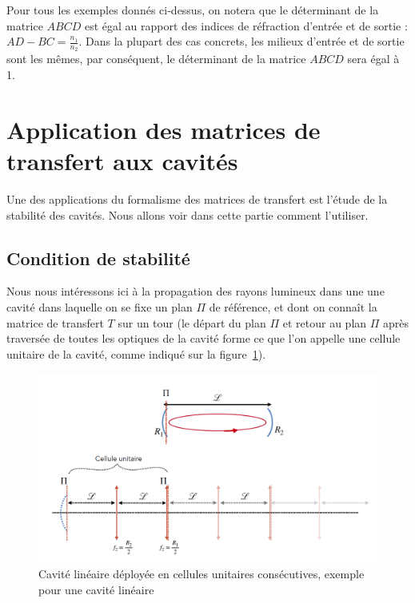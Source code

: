\documentclass[a4paper]{book}
\begin{document}
Pour tous les exemples donnés ci-dessus, on notera que le déterminant de la matrice $ABCD$ est égal au rapport des indices de réfraction d'entrée et de sortie : $AD - BC = \frac{n_1}{n_2}$. Dans la plupart des cas concrets, les milieux d'entrée et de sortie sont les mêmes, par conséquent, le déterminant de la matrice $ABCD$ sera égal à 1.

\section{Application des matrices de transfert aux cavités}
Une des applications du formalisme des matrices de transfert est l'étude de la stabilité des cavités. Nous allons voir dans cette partie comment l'utiliser.

\subsection{Condition de stabilité}

Nous nous intéressons ici à la propagation des rayons lumineux dans une une cavité dans laquelle on se fixe un plan $\Pi$ de référence, et dont on connaît la matrice de transfert $T$ sur un tour (le départ du plan $\Pi$ et retour au plan $\Pi$ après traversée de toutes les optiques de la cavité forme ce que l'on appelle une cellule unitaire de la cavité, comme indiqué sur la figure~\ref{fig:cell}). 


\begin{figure}[!htbp]
\begin{center}
\includegraphics[width=15cm]{pictures/cell.png}
\end{center}
\caption{Cavité linéaire déployée en cellules unitaires consécutives, exemple pour une cavité linéaire}
\label{fig:cell}
\end{figure}
\end{document}
